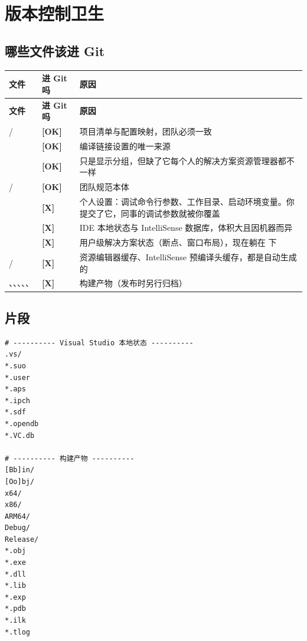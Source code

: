 {{\section{版本控制卫生}

\subsection{哪些文件该进 Git}

\begin{longtable}{L{5.2cm}L{1.6cm}L{7.8cm}}
\toprule
\textbf{文件} & \textbf{进 Git 吗} & \textbf{原因} \\
\midrule
\endfirsthead
\toprule
\textbf{文件} & \textbf{进 Git 吗} & \textbf{原因} \\
\midrule
\endhead
\bottomrule
\endlastfoot
{} /  & \textbf{[OK]} & 项目清单与配置映射，团队必须一致 \\
 & \textbf{[OK]} & 编译链接设置的唯一来源 \\
 & \textbf{[OK]} & 只是显示分组，但缺了它每个人的解决方案资源管理器都不一样 \\
 /  & \textbf{[OK]} & 团队规范本体 \\
 & \textbf{[X]} & 个人设置：调试命令行参数、工作目录、启动环境变量。你提交了它，同事的调试参数就被你覆盖 \\
 & \textbf{[X]} & IDE 本地状态与 IntelliSense 数据库，体积大且因机器而异 \\
 & \textbf{[X]} & 用户级解决方案状态（断点、窗口布局），现在躺在  下 \\
 /  & \textbf{[X]} & 资源编辑器缓存、IntelliSense 预编译头缓存，都是自动生成的 \\
、、、、、 & \textbf{[X]} & 构建产物（发布时另行归档） \\
\end{longtable}

\subsection{ 片段}

\begin{lstlisting}[style=inistyle]
# ---------- Visual Studio 本地状态 ----------
.vs/
*.suo
*.user
*.aps
*.ipch
*.sdf
*.opendb
*.VC.db

# ---------- 构建产物 ----------
[Bb]in/
[Oo]bj/
x64/
x86/
ARM64/
Debug/
Release/
*.obj
*.exe
*.dll
*.lib
*.exp
*.pdb
*.ilk
*.tlog


\end{lstlisting}}}

